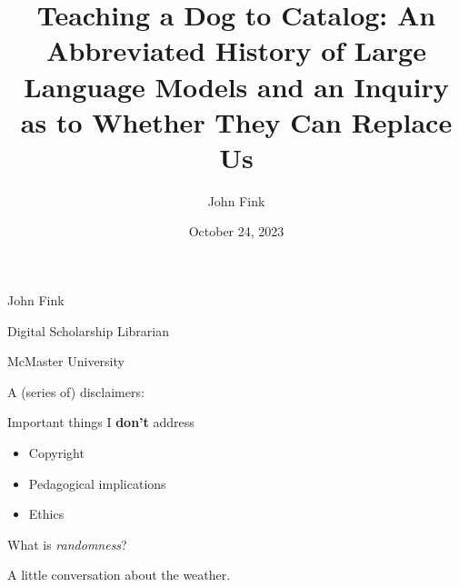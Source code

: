 \documentclass{beamer}
\title{Teaching a Dog to Catalog: An Abbreviated History of Large Language Models and an Inquiry as to Whether They Can Replace Us}
\author{John Fink}
\institute{McMaster University}
\date{October 24, 2023}
\begin{document}
\begin{frame}
    \maketitle
\end{frame}

\begin{frame}
	John Fink
	
	Digital Scholarship Librarian
	
	McMaster University
\end{frame}

% 


\begin{frame}
	A (series of) disclaimers:
\end{frame}
 
 

 \begin{frame}[plain]
 \end{frame}

\begin{frame}{Important things I \textbf{don't} address}
	\begin{itemize}
		\item Copyright
		\pause
		\item Pedagogical implications
		\pause
		\item Ethics
	\end{itemize}
\end{frame}

 \begin{frame}
 	What is \textit{randomness}?
 \end{frame}



\begin{frame}
	A little conversation about the weather.
\end{frame}
\end{document}
